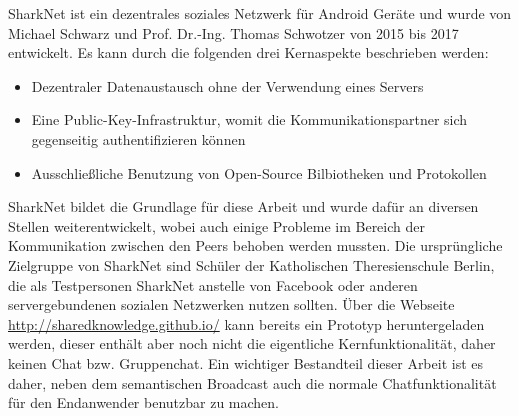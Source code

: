 SharkNet ist ein dezentrales soziales Netzwerk für Android Geräte und wurde von Michael Schwarz und Prof. Dr.-Ing. Thomas Schwotzer von 2015 bis 2017 entwickelt. Es kann durch die folgenden drei Kernaspekte beschrieben werden:
\begin{itemize}
	\item Dezentraler Datenaustausch ohne der Verwendung eines Servers
	\item Eine Public-Key-Infrastruktur, womit die Kommunikationspartner sich gegenseitig authentifizieren können
	\item Ausschließliche Benutzung von Open-Source Bilbiotheken und Protokollen
\end{itemize}
SharkNet bildet die Grundlage für diese Arbeit und wurde dafür an diversen Stellen weiterentwickelt, wobei auch einige Probleme im Bereich der Kommunikation zwischen den Peers behoben werden mussten. Die ursprüngliche Zielgruppe von SharkNet sind Schüler der Katholischen Theresienschule Berlin, die als Testpersonen SharkNet anstelle von Facebook oder anderen servergebundenen sozialen Netzwerken nutzen sollten. Über die Webseite \url{http://sharedknowledge.github.io/} kann bereits ein Prototyp heruntergeladen werden, dieser enthält aber noch nicht die eigentliche Kernfunktionalität, daher keinen Chat bzw. Gruppenchat. Ein wichtiger Bestandteil dieser Arbeit ist es daher, neben dem semantischen Broadcast auch die normale Chatfunktionalität für den Endanwender benutzbar zu machen.  
\newpage



